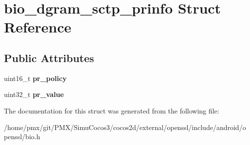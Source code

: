 \hypertarget{structbio__dgram__sctp__prinfo}{}\section{bio\+\_\+dgram\+\_\+sctp\+\_\+prinfo Struct Reference}
\label{structbio__dgram__sctp__prinfo}
\subsection*{Public Attributes}
\begin{DoxyCompactItemize}
\item 
\mbox{\label{structbio__dgram__sctp__prinfo_a758b4f0c23b00677d3e0f8b08b5166a8}} 
uint16\+\_\+t {\bfseries pr\+\_\+policy}
\item 
\mbox{\label{structbio__dgram__sctp__prinfo_aaef676fc35f418527ebfde25c1fc047e}} 
uint32\+\_\+t {\bfseries pr\+\_\+value}
\end{DoxyCompactItemize}


The documentation for this struct was generated from the following file\+:\begin{DoxyCompactItemize}
\item 
/home/pmx/git/\+P\+M\+X/\+Simu\+Cocos3/cocos2d/external/openssl/include/android/openssl/bio.\+h\end{DoxyCompactItemize}
